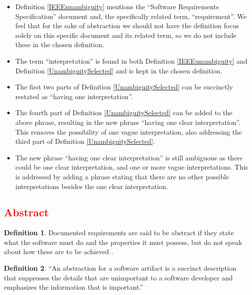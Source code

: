 \documentclass[letterpaper, cleveref]{lipics-v2019}
\newcommand{\authornote}[3]{\textcolor{#1}{[#3 ---#2]}}
\newcommand{\authornote}[3]{}
\newcommand{\wss}[1]{\authornote{blue}{SS}{#1}} %
\newcommand{\notdone}[1]{\textcolor{red}{#1}}
\theoremstyle{definition}
\newtheorem{defn}{Definition}
\begin{document}
\begin{itemize}
  \item Definition \ref{IEEEunambiguity} mentions the ``Software Requirements Specification'' document and, the specifically related term, ``requirement''. We feel that for the sake of abstraction we should not have the definition focus solely on this specific document and its related term, so we do not include these in the chosen definition.
  \item The term ``interpretation'' is found in both Definition \ref{IEEEunambiguity} and Definition \ref{UnambiguitySelected} and is kept in the chosen definition.
  \item The first two parts of Definition \ref{UnambiguitySelected} can be succinctly restated as ``having one interpretation''.
  \item The fourth part of Definition \ref{UnambiguitySelected} can be added to the above phrase, resulting in the new phrase ``having one clear interpretation''. This removes the possibility of one vague interpretation, also addressing the third part of Definition \ref{UnambiguitySelected}.
  \item The new phrase ``having one clear interpretation'' is still ambiguous as there could be one clear interpretation, and one or more vague interpretations. This is addressed by adding a phrase stating that there are no other possible interpretations besides the one clear interpretation.
\end{itemize}


\subsection{\notdone{Abstract}} %

\begin{defn}
  Documented requirements are said to be abstract if they state what the
  software must do and the properties it must possess, but do not speak about
  how these are to be achieved \citep{GhezziEtAl2003}.
\end{defn}

\begin{defn}
  ``An abstraction for a software artifact is a succinct description that
  suppresses the details that are unimportant to a software developer and
  emphasizes the information that is important.'' \citep{Krueger1992}
\end{defn}
\end{document}
